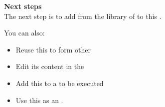 \textbf{Next steps}\\
The next step is to add \gdcases{} from the library of \gdcases{} to this \gdcase{}. 

You can also:
\begin{itemize} 
\item Reuse this \gdcase{} to form other \gdcases{}  
\item Edit its content in the \gdtestcaseeditor{} 
\item Add this \gdcase{} to a \gdsuite{} to be executed 
\item Use this \gdcase{} as an \gdehandler {}. 
\end{itemize}













